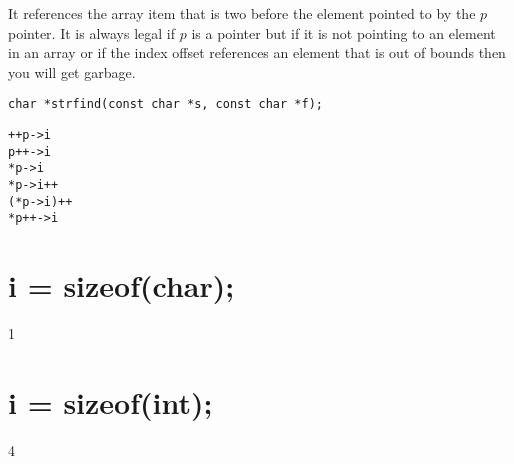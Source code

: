 \documentclass{supervision}
\begin{document}
\begin{questions}
    \begin{solution}
    It references the array item that is two before the element pointed to by the $p$ pointer. It is always legal if $p$ is a pointer but if it is not pointing to an element in an array or if the index offset references an element that is out of bounds then you will get garbage.
    \end{solution}

    \begin{lstlisting}
char *strfind(const char *s, const char *f);
    \end{lstlisting}
    \begin{solution}
        
    \end{solution}
    \begin{lstlisting}
++p->i
p++->i
*p->i
*p->i++
(*p->i)++
*p++->i
    \end{lstlisting}
    \begin{solution}
        
    \end{solution}

    \begin{solution}
        
    \end{solution}

    \begin{parts}
        \part{i = sizeof(char);}
        \begin{solution}
        1
        \end{solution}

        \part{i = sizeof(int);}
        \begin{solution}
        4
        \end{solution}

\end{parts}
\end{questions}
\end{document}

